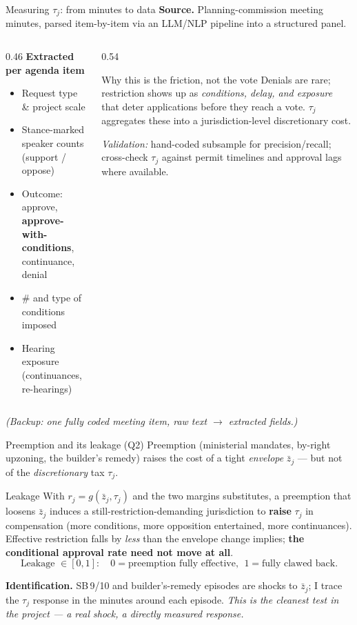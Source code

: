 \documentclass[10pt,aspectratio=169]{beamer}
\begin{document}
\begin{frame}{Measuring $\tau_j$: from minutes to data}
\textbf{Source.} Planning-commission meeting minutes, parsed item-by-item via an LLM/NLP
pipeline into a structured panel.
\medskip
\begin{columns}[T]
\begin{column}{0.46\textwidth}
\textbf{Extracted per agenda item}
\begin{itemize}\small
  \item Request type \& project scale
  \item Stance-marked speaker counts (support / oppose)
  \item Outcome: approve, \textbf{approve-with-conditions}, continuance, denial
  \item \# and type of conditions imposed
  \item Hearing exposure (continuances, re-hearings)
\end{itemize}
\end{column}
\begin{column}{0.54\textwidth}
\begin{block}{Why this is the friction, not the vote}
Denials are rare; restriction shows up as \emph{conditions, delay, and exposure} that deter
applications before they reach a vote. $\tau_j$ aggregates these into a jurisdiction-level
discretionary cost.
\end{block}
\footnotesize \emph{Validation:} hand-coded subsample for precision/recall; cross-check $\tau_j$
against permit timelines and approval lags where available.
\end{column}
\end{columns}
\medskip
\footnotesize\emph{(Backup: one fully coded meeting item, raw text $\to$ extracted fields.)}
\end{frame}

\begin{frame}{Preemption and its leakage (Q2)}
Preemption (ministerial mandates, by-right upzoning, the builder's remedy) raises the cost of a
tight \emph{envelope} $\bar z_j$ --- but not of the \emph{discretionary} tax $\tau_j$.
\medskip
\begin{block}{Leakage}
With $r_j=g(\bar z_j,\tau_j)$ and the two margins substitutes, a preemption that loosens
$\bar z_j$ induces a still-restriction-demanding jurisdiction to \textbf{raise} $\tau_j$ in
compensation (more conditions, more opposition entertained, more continuances). Effective
restriction falls by \emph{less} than the envelope change implies; \textbf{the conditional
approval rate need not move at all}.
\[ \text{Leakage } \in [0,1]:\quad 0=\text{preemption fully effective},\ \ 1=\text{fully clawed back}. \]
\end{block}
\textbf{Identification.} SB\,9/10 and builder's-remedy episodes are shocks to $\bar z_j$; I trace
the $\tau_j$ response in the minutes around each episode. \emph{This is the cleanest test in the
project --- a real shock, a directly measured response.}
\end{frame}
\end{document}
